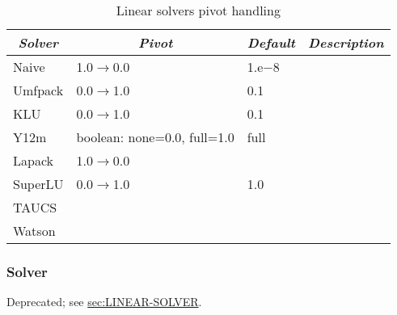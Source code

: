 \begin{table}
\centering
\caption{Linear solvers pivot handling}\label{tab:linear-solvers-pivot}
\begin{tabular}{llll}
\hline
	\multicolumn{1}{c}{\textbf{\emph{Solver}}} &
	\multicolumn{1}{c}{\textbf{\emph{Pivot}}} &
	\multicolumn{1}{c}{\textbf{\emph{Default}}} &
	\multicolumn{1}{c}{\textbf{\emph{Description}}} \\
\hline\hline
	Naive		& 1.0$\rightarrow$0.0		& 1.e$-8$	& \\
	Umfpack 	& 0.0$\rightarrow$1.0 		& 0.1 		& \\
	KLU 		& 0.0$\rightarrow$1.0 		& 0.1 		& \\
	Y12m 		& boolean: none=0.0, full=1.0	& full		& \\
	Lapack		& 1.0$\rightarrow$0.0		&		& \\
	SuperLU		& 0.0$\rightarrow$1.0		& 1.0		& \\
	TAUCS		&				&		& \\
	Watson		&				&		& \\
\hline
\end{tabular}
\end{table}



\subsubsection{Solver}   
Deprecated; see
\hyperref{\kw{linear solver}}{\kw{linear solver} (Section~}{)}{sec:LINEAR-SOLVER}.


